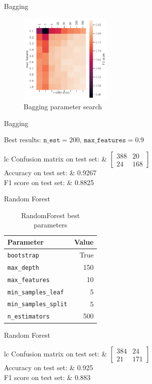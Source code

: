 \documentclass[aspectratio=169]{beamer}
\newcommand{\fresults}[3]{
\begin{table}[H]
\centering
\begin{tabular}{lc}
Confusion matrix on test set: & \( \begin{bmatrix} #1 \end{bmatrix} \) \\
    \addlinespace[0.5em]
    Accuracy on test set: & #2 \\
    F1 score on test set: & #3
\end{tabular}
\end{table}
}
\begin{document}
\begin{frame}{Bagging}
\begin{figure}[H]
\centering
\includegraphics[width=0.4\textwidth]{bagging}
\caption{Bagging parameter search}%
\label{fig:bagging}
\end{figure}

\end{frame}
\begin{frame}{Bagging}

Best results:  $\texttt{n\_est} = 200,\, \texttt{max\_features} = 0.9$

\fresults{ 388 &  20 \\ 24  & 168 }{0.9267}{0.8825}
\end{frame}

\begin{frame}{Random Forest}
\begin{table}[H]
\centering
\caption{RandomForest best parameters}
\begin{tabular}{lr}
\toprule
Parameter & Value \\
\midrule
\texttt{bootstrap} & True \\
\texttt{max\_depth} & 150 \\
\texttt{max\_features} & 10 \\
\texttt{min\_samples\_leaf} & 5 \\
\texttt{min\_samples\_split} & 5 \\
\texttt{n\_estimators} & 500 \\
\bottomrule
\end{tabular}
\end{table}
\end{frame}

\begin{frame}{Random Forest}
\fresults{ 384 &  24 \\ 21 & 171 }{0.925}{0.883}
\end{frame}
\end{document}
